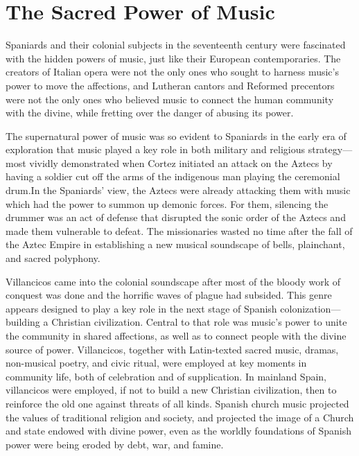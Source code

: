 

\chapter{The Sacred Power of Music}

\label{ch:sacred-power}

Spaniards and their colonial subjects in the seventeenth century were fascinated with the hidden powers of music, just like their European contemporaries.
The creators of Italian opera were not the only ones who sought to harness music's power to move the affections, and Lutheran cantors and Reformed precentors were not the only ones who believed music to connect the human community with the divine, while fretting over the danger of abusing its power.\citXXX{}

The supernatural power of music was so evident to Spaniards in the early era of exploration that music played a key role in both military and religious strategy---most vividly demonstrated when Cortez initiated an attack on the Aztecs by having a soldier cut off the arms of the indigenous man playing the ceremonial  drum.
In the Spaniards' view, the Aztecs were already attacking them with music which had the power to summon up demonic forces. 
For them, silencing the drummer was an act of defense that disrupted the sonic order of the Aztecs and made them vulnerable to defeat.
The missionaries wasted no time after the fall of the Aztec Empire in establishing a new musical soundscape of bells, plainchant, and sacred polyphony.\citXXX{}

Villancicos came into the colonial soundscape after most of the bloody work of conquest was done and the horrific waves of plague had subsided.
This genre appears designed to play a key role in the next stage of Spanish colonization---building a Christian civilization.
Central to that role was music's power to unite the community in shared affections, as well as to connect people with the divine source of power.
Villancicos, together with Latin-texted sacred music, dramas, non-musical poetry, and civic ritual, were employed at key moments in community life, both of celebration and of supplication.\citXXX{}
In mainland Spain, villancicos were employed, if not to build a new Christian civilization, then to reinforce the old one against threats of all kinds.
Spanish church music projected the values of traditional religion and society, and projected the image of a Church and state endowed with divine power, even as the worldly foundations of Spanish power were being eroded by debt, war, and famine.\citXXX{}

